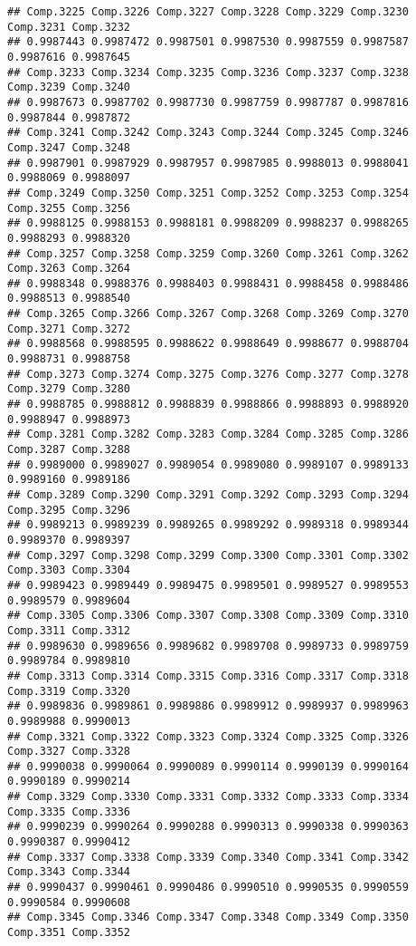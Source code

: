 \documentclass[
]{article}
\begin{document}
\begin{verbatim}
## Comp.3225 Comp.3226 Comp.3227 Comp.3228 Comp.3229 Comp.3230 Comp.3231 Comp.3232 
## 0.9987443 0.9987472 0.9987501 0.9987530 0.9987559 0.9987587 0.9987616 0.9987645 
## Comp.3233 Comp.3234 Comp.3235 Comp.3236 Comp.3237 Comp.3238 Comp.3239 Comp.3240 
## 0.9987673 0.9987702 0.9987730 0.9987759 0.9987787 0.9987816 0.9987844 0.9987872 
## Comp.3241 Comp.3242 Comp.3243 Comp.3244 Comp.3245 Comp.3246 Comp.3247 Comp.3248 
## 0.9987901 0.9987929 0.9987957 0.9987985 0.9988013 0.9988041 0.9988069 0.9988097 
## Comp.3249 Comp.3250 Comp.3251 Comp.3252 Comp.3253 Comp.3254 Comp.3255 Comp.3256 
## 0.9988125 0.9988153 0.9988181 0.9988209 0.9988237 0.9988265 0.9988293 0.9988320 
## Comp.3257 Comp.3258 Comp.3259 Comp.3260 Comp.3261 Comp.3262 Comp.3263 Comp.3264 
## 0.9988348 0.9988376 0.9988403 0.9988431 0.9988458 0.9988486 0.9988513 0.9988540 
## Comp.3265 Comp.3266 Comp.3267 Comp.3268 Comp.3269 Comp.3270 Comp.3271 Comp.3272 
## 0.9988568 0.9988595 0.9988622 0.9988649 0.9988677 0.9988704 0.9988731 0.9988758 
## Comp.3273 Comp.3274 Comp.3275 Comp.3276 Comp.3277 Comp.3278 Comp.3279 Comp.3280 
## 0.9988785 0.9988812 0.9988839 0.9988866 0.9988893 0.9988920 0.9988947 0.9988973 
## Comp.3281 Comp.3282 Comp.3283 Comp.3284 Comp.3285 Comp.3286 Comp.3287 Comp.3288 
## 0.9989000 0.9989027 0.9989054 0.9989080 0.9989107 0.9989133 0.9989160 0.9989186 
## Comp.3289 Comp.3290 Comp.3291 Comp.3292 Comp.3293 Comp.3294 Comp.3295 Comp.3296 
## 0.9989213 0.9989239 0.9989265 0.9989292 0.9989318 0.9989344 0.9989370 0.9989397 
## Comp.3297 Comp.3298 Comp.3299 Comp.3300 Comp.3301 Comp.3302 Comp.3303 Comp.3304 
## 0.9989423 0.9989449 0.9989475 0.9989501 0.9989527 0.9989553 0.9989579 0.9989604 
## Comp.3305 Comp.3306 Comp.3307 Comp.3308 Comp.3309 Comp.3310 Comp.3311 Comp.3312 
## 0.9989630 0.9989656 0.9989682 0.9989708 0.9989733 0.9989759 0.9989784 0.9989810 
## Comp.3313 Comp.3314 Comp.3315 Comp.3316 Comp.3317 Comp.3318 Comp.3319 Comp.3320 
## 0.9989836 0.9989861 0.9989886 0.9989912 0.9989937 0.9989963 0.9989988 0.9990013 
## Comp.3321 Comp.3322 Comp.3323 Comp.3324 Comp.3325 Comp.3326 Comp.3327 Comp.3328 
## 0.9990038 0.9990064 0.9990089 0.9990114 0.9990139 0.9990164 0.9990189 0.9990214 
## Comp.3329 Comp.3330 Comp.3331 Comp.3332 Comp.3333 Comp.3334 Comp.3335 Comp.3336 
## 0.9990239 0.9990264 0.9990288 0.9990313 0.9990338 0.9990363 0.9990387 0.9990412 
## Comp.3337 Comp.3338 Comp.3339 Comp.3340 Comp.3341 Comp.3342 Comp.3343 Comp.3344 
## 0.9990437 0.9990461 0.9990486 0.9990510 0.9990535 0.9990559 0.9990584 0.9990608 
## Comp.3345 Comp.3346 Comp.3347 Comp.3348 Comp.3349 Comp.3350 Comp.3351 Comp.3352 

\end{verbatim}
\end{document}
